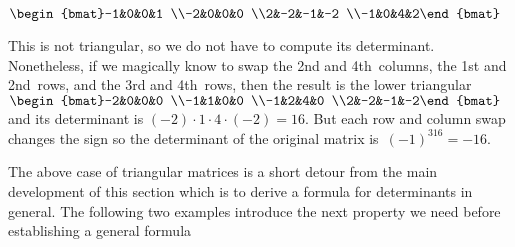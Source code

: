 \begin{example}
\begin{Parts}
\begin{reduce}
\item \(\begin{bmat}-1&0&0&1
\\-2&0&0&0
\\2&-2&-1&-2
\\-1&0&4&2\end{bmat}\)
\begin{solution} 
This is not triangular, so we do not have to compute its determinant. 
Nonetheless, if we magically know to swap the 2nd and 4th~columns, the 1st and 2nd~rows, and the 3rd and 4th~rows, then the result is the lower triangular \(\begin{bmat}-2&0&0&0
\\-1&1&0&0
\\-1&2&4&0
\\2&-2&-1&-2\end{bmat}\) and its determinant is \((-2)\cdot1\cdot4\cdot(-2)=16\). 
But each row and column swap changes the sign so the determinant of the original matrix is~\((-1)^316=-16\). 
\end{solution}
\end{reduce}
\end{Parts}
\end{example}



The above case of triangular matrices is a short detour from the main development of this section which is to derive a formula for determinants in general.
The following two examples introduce the next property we need before establishing a general formula 


